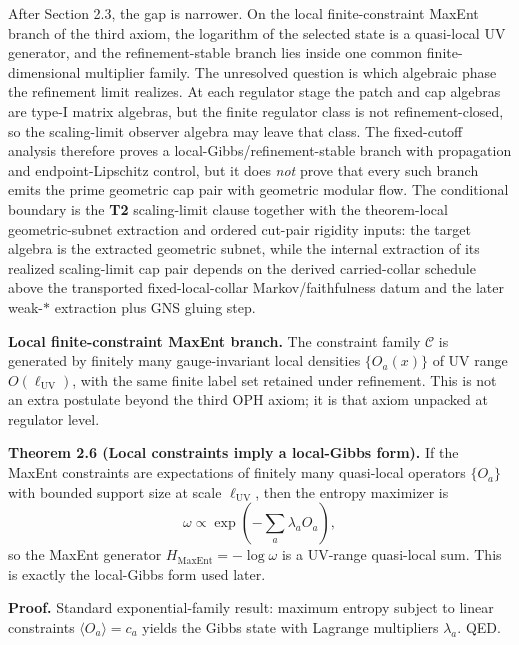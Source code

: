 After Section 2.3, the gap is narrower. On the local finite-constraint MaxEnt branch of the third axiom, the logarithm of the selected state is a quasi-local UV generator, and the refinement-stable branch lies inside one common finite-dimensional multiplier family. The unresolved question is which algebraic phase the refinement limit realizes. At each regulator stage the patch and cap algebras are type-I matrix algebras, but the finite regulator class is not refinement-closed, so the scaling-limit observer algebra may leave that class. The fixed-cutoff analysis therefore proves a local-Gibbs/refinement-stable branch with propagation and endpoint-Lipschitz control, but it does \emph{not} prove that every such branch emits the prime geometric cap pair with geometric modular flow. The conditional boundary is the \textbf{T2} scaling-limit clause together with the theorem-local geometric-subnet extraction and ordered cut-pair rigidity inputs: the target algebra is the extracted geometric subnet, while the internal extraction of its realized scaling-limit cap pair depends on the derived carried-collar schedule above the transported fixed-local-collar Markov/faithfulness datum and the later weak-\(*\) extraction plus GNS gluing step.

\textbf{Local finite-constraint MaxEnt branch.} The constraint family \(\mathcal C\) is generated by finitely many gauge-invariant local densities \(\{O_a(x)\}\) of UV range \(O(\ell_{\mathrm{UV}})\), with the same finite label set retained under refinement. This is not an extra postulate beyond the third OPH axiom; it is that axiom unpacked at regulator level.

\textbf{Theorem 2.6 (Local constraints imply a local-Gibbs form).} If the MaxEnt constraints are expectations of finitely many quasi-local operators \(\{O_a\}\) with bounded support size at scale \(\ell_{\mathrm{UV}}\), then the entropy maximizer is
\[
\omega \propto \exp\!\left(-\sum_a \lambda_a O_a\right),
\]
so the MaxEnt generator \(H_{\mathrm{MaxEnt}}=-\log\omega\) is a UV-range quasi-local sum. This is exactly the local-Gibbs form used later.

\textbf{Proof.} Standard exponential-family result: maximum entropy subject to linear constraints \(\langle O_a\rangle=c_a\) yields the Gibbs state with Lagrange multipliers \(\lambda_a\). QED.


